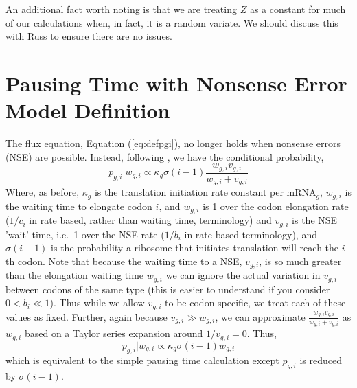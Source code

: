 \documentclass{article}
\newcommand{\waitTerm}{\ensuremath{w}\xspace}
\newcommand{\wgi}{\ensuremath{\waitTerm_{g,i}}\xspace}
\newcommand{\alphac}{\ensuremath{{\alpha_c}}\xspace}
\newcommand{\lambdacprime}{\ensuremath{{\lambda_c^\prime}}\xspace}
\newcommand{\nseTerm}{\ensuremath{v}\xspace}
\newcommand{\vgi}{\ensuremath{\nseTerm_{g,i}}\xspace}
\newcommand{\pgi}{\ensuremath{{p_{g,i}}}\xspace}
\newcommand{\ngc}{\ensuremath{{n_{g}^c}}\xspace}
\newcommand{\kappag}{\ensuremath{{\kappa_{g}}}\xspace}
\newcommand{\mRNAg}{mRNA$_g$\xspace}
\newcommand{\Ygc}{\ensuremath{{Y_{g}^c}}\xspace}
\begin{document}
An additional fact worth noting is that we are treating $Z$ as a constant for much of our calculations when, in fact, it is a random variate.
We should discuss this with Russ to ensure there are no issues.



\section*{Pausing Time with Nonsense Error Model Definition}
The flux equation, Equation (\ref{eq:defpgi}), no longer holds when nonsense errors (NSE) are possible.
Instead, following \citet{GilchristAndWagner2006}, we have the conditional probability,
\begin{equation}
\label{eq:defpgiNse}
\pgi|\wgi \propto \kappag \sigma(i-1) \frac{\wgi \vgi}{\wgi + \vgi}
\end{equation} 
Where, as before, \kappag is the translation initiation rate constant per \mRNAg, \wgi is the waiting time to elongate codon $i$, and  \wgi is 1 over the codon elongation rate ($1/c_i$ in rate based, rather than waiting time, terminology) and \vgi is the NSE 'wait' time, i.e.~1 over the NSE rate ($1/b_i$ in rate based terminology), and $\sigma(i-1)$ is the probability a ribosome that initiates translation will reach the $i$th codon.
Note that because the waiting time to a NSE, \vgi, is so much greater than the elongation waiting time \wgi we can ignore the actual variation in \vgi between codons of the same type (this is easier to understand if you consider $0 < b_i \ll 1$).
Thus while we allow \vgi to be codon specific, we treat each of these values as fixed.
Further, again because $\vgi \gg \wgi$, we can approximate $\frac{\wgi \vgi}{\wgi + \vgi}$ as $\wgi$ based on a Taylor series expansion around $1/\vgi = 0 $.
Thus,
\begin{equation}
\label{eq:defpgiNseApprox}
\pgi|\wgi \propto \kappag \sigma(i-1) \wgi
\end{equation} 
which is equivalent to the simple pausing time calculation except $\pgi$ is reduced by $\sigma(i-1)$.
\end{document}
